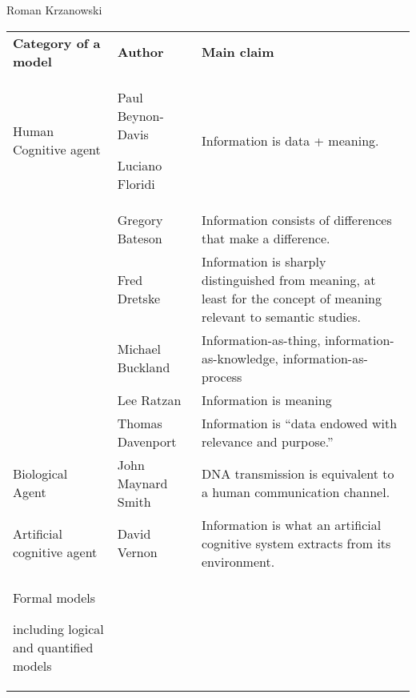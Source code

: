\begin{artengenv}{Roman Krzanowski}
\begin{small}
\begin{longtable}{p{}p{}p{}}
{\bfseries Category of a model} &
{\bfseries Author} &
{\bfseries Main claim}\\
Human Cognitive agent &
Paul Beynon-Davis
\parencite*[][]{beynon-davies_business_2009}%


Luciano Floridi
\parencite*[][]{floridi_philosophy_2010}%
 &
Information is data + meaning.\\
&
Gregory Bateson
\parencite*[][]{bateson_mind_1979}%
 &
Information consists of differences that make a difference.\\
&
Fred Dretske
\parencite*[][]{dretske_knowledge_1999}%
 &
Information is sharply distinguished from meaning, at least for the concept of meaning relevant to semantic studies.\\
&
Michael Buckland
\parencite*[][]{buckland_information_1991}%
 &
Information-as-thing, information-as-knowledge, information-as-process\\
&
Lee Ratzan
\parencite*[][]{ratzan_understanding_2004}%
 &
Information is meaning\\
&
Thomas Davenport
\parencite*[][]{davenport_information_1997}%
 &
Information is ``data endowed with relevance and purpose.''\\
Biological Agent &
John Maynard Smith
\parencite*[][]{maynard_smith_concept_2000}%
 &
DNA transmission is equivalent to a human communication channel.\\
Artificial cognitive agent &
David Vernon
\parencite*[][]{vernon_artificial_2014}%
 &
Information is what an artificial cognitive system extracts from its environment.\\
Formal models

including logical and quantified models


\end{longtable}
\end{small}
\end{artengenv}

